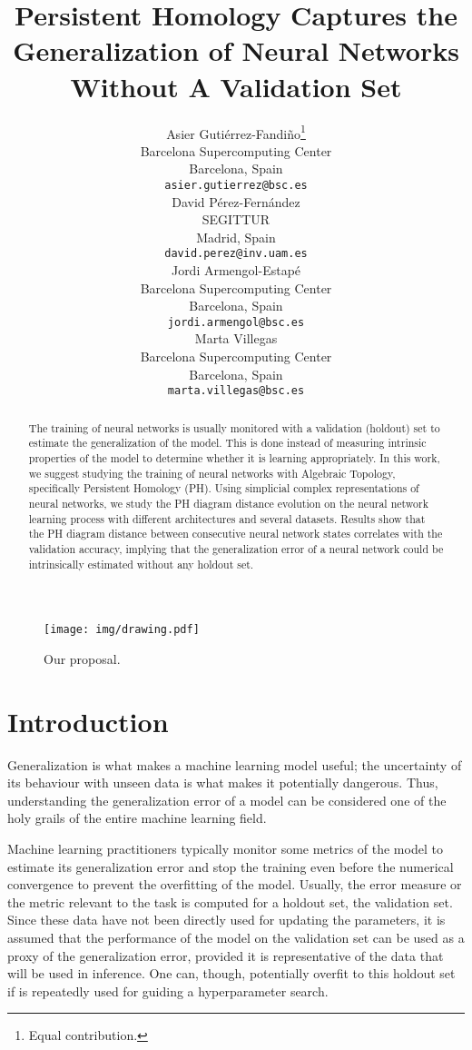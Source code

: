 \documentclass{article}
\title{Persistent Homology Captures the Generalization of Neural Networks Without A Validation Set}
\author{
 Asier Gutiérrez-Fandiño\thanks{Equal contribution.}\\
  Barcelona Supercomputing Center\\
  Barcelona, Spain\\
  \texttt{asier.gutierrez@bsc.es} \\
   \And
 David Pérez-Fernández\printfnsymbol{1} \\
  SEGITTUR\\
  Madrid, Spain\\
  \texttt{david.perez@inv.uam.es} \\
  \And
 Jordi Armengol-Estapé \\
  Barcelona Supercomputing Center\\
  Barcelona, Spain\\
  \texttt{jordi.armengol@bsc.es} \\
  \And
 Marta Villegas \\
  Barcelona Supercomputing Center\\
  Barcelona, Spain\\
  \texttt{marta.villegas@bsc.es} \\
}
\begin{document}
\maketitle
\begin{figure}[!ht]
\centering
    \texttt{[image: img/drawing.pdf]}
    \caption{Our proposal.} 
    \label{fig:proposal}
\end{figure}


\begin{abstract}
The training of neural networks is usually monitored with a validation (holdout) set to estimate the generalization of the model. This is done instead of measuring intrinsic properties of the model to determine whether it is learning appropriately. In this work, we suggest studying the training of neural networks with Algebraic Topology, specifically Persistent Homology (PH). Using simplicial complex representations of neural networks, we study the PH diagram distance evolution on the neural network learning process with different architectures and several datasets. Results show that the PH diagram distance between consecutive neural network states correlates with the validation accuracy, implying that the generalization error of a neural network could be intrinsically estimated without any holdout set.
\end{abstract}

\section{Introduction}
Generalization is what makes a machine learning model useful; the uncertainty of its behaviour with unseen data is what makes it potentially dangerous. Thus, understanding the generalization error of a model can be considered one of the holy grails of the entire machine learning field.

Machine learning practitioners typically monitor some metrics of the model to estimate its generalization error and stop the training even before the numerical convergence to prevent the overfitting of the model. Usually, the error measure or the metric relevant to the task is computed for a holdout set, the validation set. Since these data have not been directly used for updating the parameters, it is assumed that the performance of the model on the validation set can be used as a proxy of the generalization error, provided it is representative of the data that will be used in inference.  One can, though, potentially overfit to this holdout set if is repeatedly used for guiding a hyperparameter search.
\end{document}
